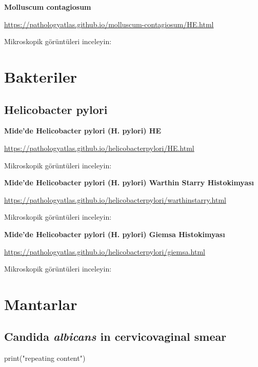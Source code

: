 \documentclass[
  letterpaper,
  DIV=11,
  numbers=noendperiod]{scrreprt}
\newenvironment{Shaded}{}{}
\newcommand{\FunctionTok}[1]{\textcolor[rgb]{0.44,0.26,0.76}{#1}}
\newcommand{\NormalTok}[1]{\textcolor[rgb]{0.14,0.16,0.18}{#1}}
\newcommand{\StringTok}[1]{\textcolor[rgb]{0.01,0.18,0.38}{#1}}
\begin{document}
\textbf{Molluscum contagiosum}

\url{https://pathologyatlas.github.io/molluscum-contagiosum/HE.html}

Mikroskopik görüntüleri inceleyin:

\hypertarget{bakteriler}{%
\chapter{Bakteriler}\label{bakteriler}}

\hypertarget{helicobacter-pylori}{%
\section{Helicobacter pylori}\label{helicobacter-pylori}}

\textbf{Mide'de Helicobacter pylori (H. pylori) HE}

\url{https://pathologyatlas.github.io/helicobacterpylori/HE.html}

Mikroskopik görüntüleri inceleyin:

\textbf{Mide'de Helicobacter pylori (H. pylori) Warthin Starry
Histokimyası}

\url{https://pathologyatlas.github.io/helicobacterpylori/warthinstarry.html}

Mikroskopik görüntüleri inceleyin:

\textbf{Mide'de Helicobacter pylori (H. pylori) Giemsa Histokimyası}

\url{https://pathologyatlas.github.io/helicobacterpylori/giemsa.html}

Mikroskopik görüntüleri inceleyin:

\hypertarget{mantarlar}{%
\chapter{Mantarlar}\label{mantarlar}}

\hypertarget{candida-albicans-in-cervicovaginal-smear}{%
\section{\texorpdfstring{Candida \emph{albicans} in cervicovaginal
smear}{Candida albicans in cervicovaginal smear}}\label{candida-albicans-in-cervicovaginal-smear}}

\begin{Shaded}
\begin{Highlighting}[]
\FunctionTok{print}\NormalTok{(}\StringTok{"repeating content"}\NormalTok{)}
\end{Highlighting}
\end{Shaded}
\end{document}
